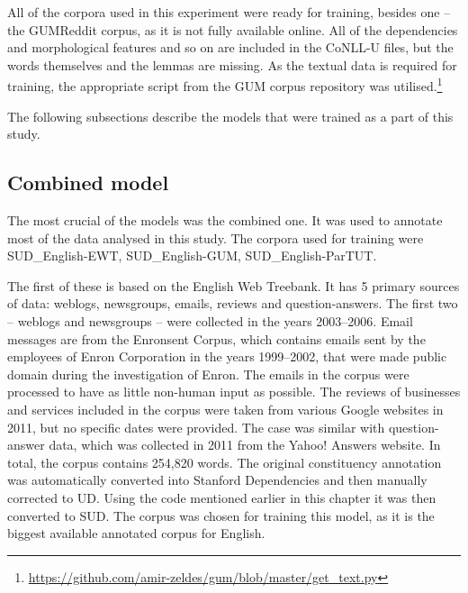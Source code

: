All of the corpora used in this experiment were ready for training, besides one -- the GUMReddit corpus, as it is not fully available online. All of the dependencies and morphological features and so on are included in the CoNLL-U files, but the words themselves and the lemmas are missing. As the textual data is required for training, the appropriate script from the GUM corpus repository was utilised.\footnote{\url{https://github.com/amir-zeldes/gum/blob/master/get_text.py}} 

The following subsections describe the models that were trained as a part of this study.

\subsection{Combined model}

The most crucial of the models was the combined one. It was used to annotate most of the data analysed in this study. The corpora used for training were SUD\_English-EWT, SUD\_English-GUM, SUD\_English-ParTUT. 

The first of these is based on the English Web Treebank. It has 5 primary sources of data: weblogs, newsgroups, emails, reviews and question-answers. The first two -- weblogs and newsgroups -- were collected in the years 2003--2006. Email messages are from the Enronsent Corpus, which contains emails sent by the employees of Enron Corporation in the years 1999--2002, that were made public domain during the investigation of Enron. The emails in the corpus were processed to have as little non-human input as possible. The reviews of businesses and services included in the corpus were taken from various Google websites in 2011, but no specific dates were provided. The case was similar with question-answer data, which was collected in 2011 from the Yahoo! Answers website. In total, the corpus contains 254,820 words. The original constituency annotation was automatically converted into Stanford Dependencies and then manually corrected to UD. Using the code mentioned earlier in this chapter it was then converted to SUD. The corpus was chosen for training this model, as it is the biggest available annotated corpus for English. 

